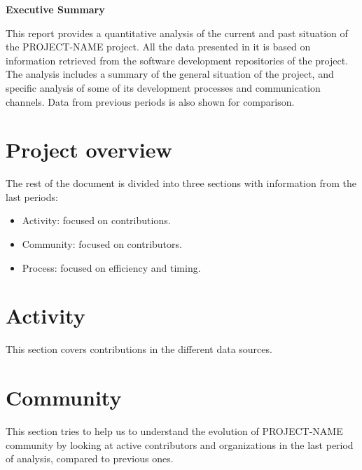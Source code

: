 \documentclass[a4wide,11pt]{article}
\begin{document}
\begin{CJK}{UTF8}{bsmi}
\newpage

\begin{center}
\textbf{Executive Summary}
\end{center}

This report provides a quantitative analysis of the current and past situation of the PROJECT-NAME project. All the data presented in it is based on information retrieved from the software development repositories of the project. The analysis includes a summary of the general situation of the project, and specific analysis of some of its development processes and communication channels. Data from previous periods is also shown for comparison.

\newpage

\setcounter{tocdepth}{4}
\setcounter{secnumdepth}{4}
\tableofcontents

\newpage

\section{Project overview} \label{overview}



The rest of the document is divided into three sections with information from the last periods: 

\begin{itemize}
\item Activity: focused on contributions. 
\item Community: focused on contributors.
\item Process: focused on efficiency and timing.
\end{itemize}

\section{Activity} \label{activity}
This section covers contributions in the different data sources.\\




\section{Community} \label{community}
This section tries to help us to understand the evolution of PROJECT-NAME community by looking at active contributors and organizations in the last period of analysis, compared to previous ones.\\


\end{CJK}
\end{document}
